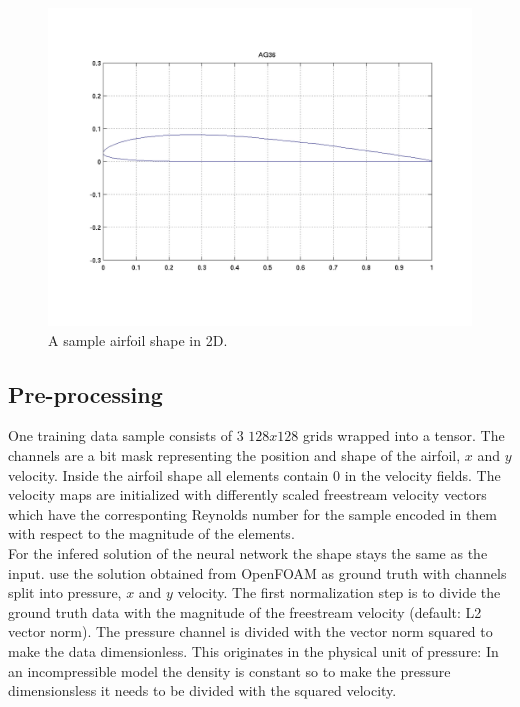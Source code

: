 \documentclass[acmtog]{techreportacmart}
\begin{document}
\begin{figure}[H]
  \includegraphics[width=.4\textwidth]{figures/uiuc_sample}
  \vspace*{-10mm}
  \caption{A sample airfoil shape in 2D.}
  \label{fig:one}
\end{figure}

\subsection{Pre-processing}
One training data sample consists of $3$ $128x128$ grids wrapped into a tensor. The channels are a bit mask representing the position and shape of the airfoil, $x$ and $y$ velocity. Inside the airfoil shape all elements contain $0$ in the velocity fields. The velocity maps are initialized with differently scaled freestream velocity vectors which have the corresponting Reynolds number for the sample encoded in them with respect to the magnitude of the elements. \\For the infered solution of the neural network the shape stays the same as the input. \cite{Thuerey20} use the solution obtained from OpenFOAM as ground truth with channels split into pressure, $x$ and $y$ velocity. The first normalization step is to divide the  ground truth data with the magnitude of the freestream velocity (default: L2 vector norm). The pressure channel is divided with the vector norm squared to make the data dimensionless. This originates in the physical unit of pressure: In an incompressible model the density is constant so to make the pressure dimensionsless it needs to be divided with the squared velocity. \\
\end{document}
